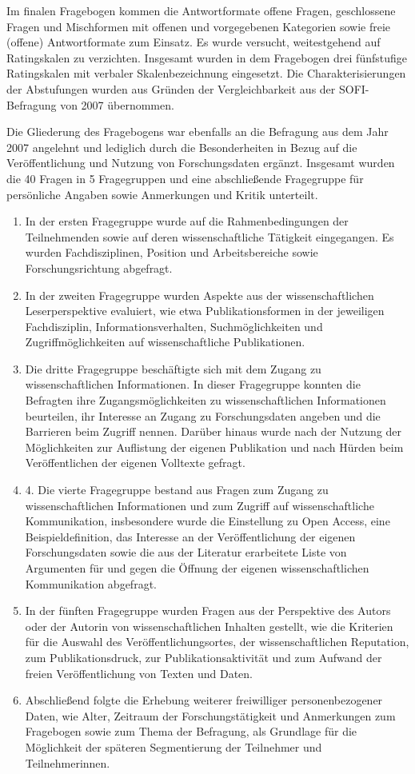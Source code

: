 Im finalen Fragebogen kommen die Antwortformate offene Fragen, geschlossene Fragen und Mischformen mit offenen und vorgegebenen Kategorien sowie freie (offene) Antwortformate zum Einsatz. Es wurde versucht, weitestgehend auf Ratingskalen zu verzichten. Insgesamt wurden in dem Fragebogen drei fünfstufige Ratingskalen mit verbaler Skalenbezeichnung eingesetzt. Die Charakterisierungen der Abstufungen wurden aus Gründen der Vergleichbarkeit aus der SOFI-Befragung von 2007 übernommen.

Die Gliederung des Fragebogens war ebenfalls an die Befragung aus dem Jahr 2007 angelehnt und lediglich durch die Besonderheiten in Bezug auf die Veröffentlichung und Nutzung von Forschungsdaten ergänzt. Insgesamt wurden die 40 Fragen in 5 Fragegruppen und eine abschließende Fragegruppe für persönliche Angaben sowie Anmerkungen und Kritik unterteilt.

\begin{enumerate}
\item In der ersten Fragegruppe wurde auf die Rahmenbedingungen der Teilnehmenden sowie auf deren wissenschaftliche Tätigkeit eingegangen. Es wurden Fachdisziplinen, Position und Arbeitsbereiche sowie Forschungsrichtung abgefragt.
\item In der zweiten Fragegruppe wurden Aspekte aus der wissenschaftlichen Leserperspektive evaluiert, wie etwa Publikationsformen in der jeweiligen Fachdisziplin, Informationsverhalten, Suchmöglichkeiten und Zugriffmöglichkeiten auf wissenschaftliche Publikationen.
\item Die dritte Fragegruppe beschäftigte sich mit dem Zugang zu wissenschaftlichen Informationen. In dieser Fragegruppe konnten die Befragten ihre Zugangsmöglichkeiten zu wissenschaftlichen Informationen beurteilen, ihr Interesse an Zugang zu Forschungsdaten angeben und die Barrieren beim Zugriff nennen. Darüber hinaus wurde nach der Nutzung der Möglichkeiten zur Auflistung der eigenen Publikation und nach Hürden beim Veröffentlichen der eigenen Volltexte gefragt.
\item 4.	Die vierte Fragegruppe bestand aus Fragen zum Zugang zu wissenschaftlichen Informationen und zum Zugriff auf wissenschaftliche Kommunikation, insbesondere wurde die Einstellung zu Open Access, eine Beispieldefinition, das Interesse an der Veröffentlichung der eigenen Forschungsdaten sowie die aus der Literatur erarbeitete Liste von Argumenten für und gegen die Öffnung der eigenen wissenschaftlichen Kommunikation abgefragt.
\item In der fünften Fragegruppe wurden Fragen aus der Perspektive des Autors oder der Autorin von wissenschaftlichen Inhalten gestellt, wie die Kriterien für die Auswahl des Veröffentlichungsortes, der wissenschaftlichen Reputation, zum Publikationsdruck, zur Publikationsaktivität und zum Aufwand der freien Veröffentlichung von Texten und Daten.
\item Abschließend folgte die Erhebung weiterer freiwilliger personenbezogener Daten, wie Alter, Zeitraum der Forschungstätigkeit und Anmerkungen zum Fragebogen sowie zum Thema der Befragung, als Grundlage für die Möglichkeit der späteren Segmentierung der Teilnehmer und Teilnehmerinnen.
\end{enumerate}

